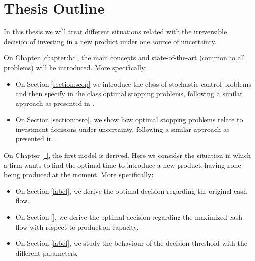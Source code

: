 



\section{Thesis Outline}
\label{section:outline}

In this thesis we will treat different situations related with the irreversible decision of investing in a new product under one source of uncertainty.

On Chapter \ref{chapter:bc}, the main concepts and state-of-the-art (common to all problems) will be introduced. More specifically:
\begin{itemize}
	\item On Section \ref{section:scop} we introduce the class of stochastic control problems and then specify in the class optimal stopping problems, following a similar approach as presented in \cite{ross}.
	
	\item On Section \ref{section:osro}, we show how optimal stopping problems relate to investment decisions under uncertainty,  following a similar approach as presented in \cite{dixit:book}.
\end{itemize}

On Chapter \ref{ }, the first model is derived. Here we consider the situation in which a firm wants to find the optimal time to introduce a new product, having none being produced at the moment. More specifically:
\begin{itemize}
	\item On Section \ref{label}, we derive the optimal decision regarding the original cash-flow.
	
	\item On Section \ref{}, we derive the optimal decision regarding the maximized cash-flow with respect to production capacity.
	
	\item On Section \ref{label}, we study the behaviour of the decision threshold with the different parameters.
\end{itemize}

